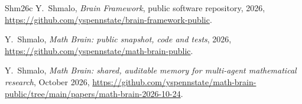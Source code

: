 \documentclass[11pt]{amsart}
\theoremstyle{remark}
\numberwithin{equation}{section}
\begin{document}
\begin{thebibliography}{Shm26c}
Y.~Shmalo, \emph{Brain Framework}, public software repository, 2026, \url{https://github.com/yspennstate/brain-framework-public}.

Y.~Shmalo, \emph{Math Brain: public snapshot, code and tests}, 2026, \url{https://github.com/yspennstate/math-brain-public}.

Y.~Shmalo, \emph{Math Brain: shared, auditable memory for multi-agent mathematical research}, October 2026, \url{https://github.com/yspennstate/math-brain-public/tree/main/papers/math-brain-2026-10-24}.

\end{thebibliography}
\end{document}

